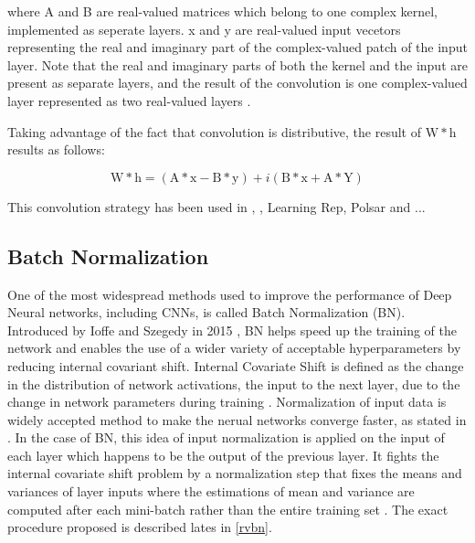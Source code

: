 where A and B are real-valued matrices which belong to one complex kernel, implemented as seperate layers. x and y are real-valued input vecetors  representing the real and imaginary part of the complex-valued patch of the input layer. Note that the real and imaginary parts of both the kernel and the input are present as separate layers, and the result of the convolution is one complex-valued layer represented as two real-valued layers \cite{Guberman}. 

Taking advantage of the fact that convolution is distributive, the result of $\mathrm{W*h}$ results as follows:

 \begin{equation}
\mathrm{W*h} = (\mathrm{A*x-B*y})+i(\mathrm{B*x+A*Y})
\label{eqCconv}
\end{equation}


This convolution strategy has been used in \cite{Guberman}, \cite{trabelsi2018deep} , Learning Rep, Polsar and ...  
 \subsection{Batch Normalization}\label{ssec:bn}
One of the most widespread methods used to improve the performance of Deep Neural networks, including CNNs, is called Batch Normalization (BN). 
Introduced by Ioffe and Szegedy in 2015 \cite{bnIoffeS15}, BN helps speed up the training of the network and enables the use of a wider variety of acceptable hyperparameters by reducing internal covariant shift. 
Internal Covariate Shift is defined as the change in the distribution of network activations, the input to the next layer, due to the change in network parameters during training \cite{bnIoffeS15}. Normalization of input data is widely accepted method to make the nerual networks converge faster, as stated in \cite{LeCun1998}. In the case of BN, this idea of input normalization is applied on the input of each layer which happens to be the output of the previous layer. It fights the internal covariate shift problem by a normalization step that fixes the means and variances of layer inputs where the estimations of mean and variance are computed
after each mini-batch rather than the entire training set \cite{recent_advances}. The exact procedure proposed is described lates in \ref{rvbn}.


